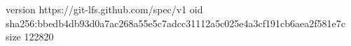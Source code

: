 version https://git-lfs.github.com/spec/v1
oid sha256:bbedb4db93d0a7ac268a55e5c7adcc31112a5c025e4a3cf191cb6aea2f581e7c
size 122820
